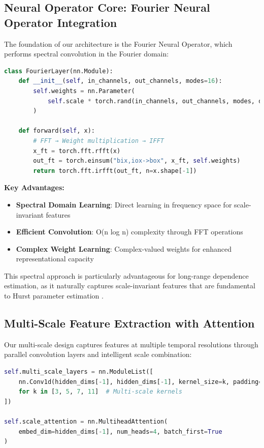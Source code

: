 \subsection{Neural Operator Core: Fourier Neural Operator Integration}

The foundation of our architecture is the Fourier Neural Operator, which performs spectral convolution in the Fourier domain:

\begin{lstlisting}[language=Python, caption=Fourier Layer Implementation]
class FourierLayer(nn.Module):
    def __init__(self, in_channels, out_channels, modes=16):
        self.weights = nn.Parameter(
            self.scale * torch.rand(in_channels, out_channels, modes, dtype=torch.cfloat)
        )
    
    def forward(self, x):
        # FFT → Weight multiplication → IFFT
        x_ft = torch.fft.rfft(x)
        out_ft = torch.einsum("bix,iox->box", x_ft, self.weights)
        return torch.fft.irfft(out_ft, n=x.shape[-1])
\end{lstlisting}

\textbf{Key Advantages:}
\begin{itemize}
    \item \textbf{Spectral Domain Learning}: Direct learning in frequency space for scale-invariant features
    \item \textbf{Efficient Convolution}: O(n log n) complexity through FFT operations
    \item \textbf{Complex Weight Learning}: Complex-valued weights for enhanced representational capacity
\end{itemize}

This spectral approach is particularly advantageous for long-range dependence estimation, as it naturally captures scale-invariant features that are fundamental to Hurst parameter estimation \cite{mandelbrot1968fractional, hurst1951long}.

\subsection{Multi-Scale Feature Extraction with Attention}

Our multi-scale design captures features at multiple temporal resolutions through parallel convolution layers and intelligent scale combination:

\begin{lstlisting}[language=Python, caption=Multi-Scale Layer Design]
self.multi_scale_layers = nn.ModuleList([
    nn.Conv1d(hidden_dims[-1], hidden_dims[-1], kernel_size=k, padding=k//2)
    for k in [3, 5, 7, 11]  # Multi-scale kernels
])

self.scale_attention = nn.MultiheadAttention(
    embed_dim=hidden_dims[-1], num_heads=4, batch_first=True
)
\end{lstlisting}

